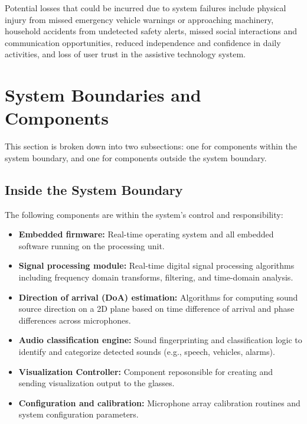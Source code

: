 \documentclass{article}
\begin{document}
Potential losses that could be incurred due to system failures include physical injury from missed emergency vehicle warnings or approaching machinery, household accidents from undetected safety alerts, missed social interactions and communication opportunities, reduced independence and confidence in daily activities, and loss of user trust in the assistive technology system.

\section{System Boundaries and Components}

This section is broken down into two subsections: one for components within the
system boundary, and one for components outside the system boundary.

\subsection{Inside the System Boundary}

The following components are within the system's control and responsibility:

\begin{itemize}
\item \textbf{Embedded firmware:} Real-time operating system and all
embedded software running on the processing unit.

\item \textbf{Signal processing module:} Real-time digital signal processing
algorithms including frequency domain transforms, filtering, and time-domain
analysis.

\item \textbf{Direction of arrival (DoA) estimation:} Algorithms for
computing sound source direction on a 2D plane based on time difference of
arrival and phase differences across microphones.

\item \textbf{Audio classification engine:} Sound fingerprinting and
classification logic to identify and categorize detected sounds (e.g.,
speech, vehicles, alarms).

\item \textbf{Visualization Controller:} \label{comp:viz_controller}
Component reposonsible for creating and sending visualization output to the
glasses.

\item \textbf{Configuration and calibration:} Microphone array calibration
routines and system configuration parameters.
\end{itemize}
\end{document}
